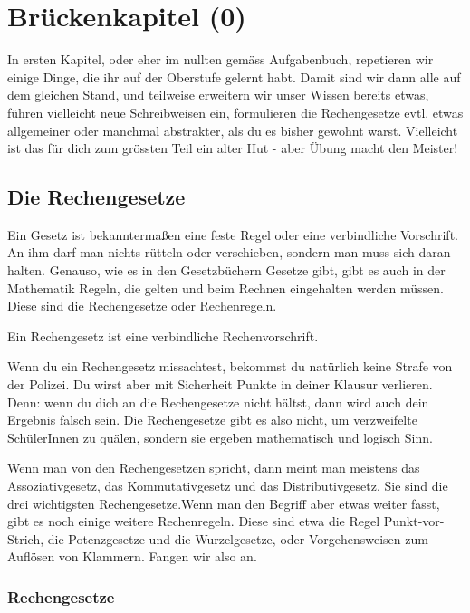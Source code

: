 \chapter{Brückenkapitel (0)}
In ersten Kapitel, oder eher im nullten gemäss Aufgabenbuch, repetieren wir einige Dinge, die ihr auf der Oberstufe gelernt habt. Damit sind wir dann alle auf dem gleichen Stand, und teilweise erweitern wir unser Wissen bereits etwas, führen vielleicht neue Schreibweisen ein, formulieren die Rechengesetze evtl. etwas allgemeiner oder manchmal abstrakter, als du es bisher gewohnt warst. Vielleicht ist das für dich zum grössten Teil ein alter Hut - aber Übung macht den Meister!

\section{Die Rechengesetze}
Ein Gesetz ist bekanntermaßen eine feste Regel oder eine verbindliche Vorschrift. An ihm darf man nichts rütteln oder verschieben, sondern man muss sich daran halten. Genauso, wie es in den Gesetzbüchern Gesetze gibt, gibt es auch in der Mathematik Regeln, die gelten und beim Rechnen eingehalten werden müssen. Diese sind die Rechengesetze oder Rechenregeln.

\begin{tcolorbox}[colback=green!10!white,colframe=green!70!black,title=Rechengesetz,width=.9\linewidth]
		Ein Rechengesetz ist eine verbindliche Rechenvorschrift.
\end{tcolorbox}

Wenn du ein Rechengesetz missachtest, bekommst du natürlich keine Strafe von der Polizei. Du wirst aber mit Sicherheit Punkte in deiner Klausur verlieren. Denn: wenn du dich an die Rechengesetze nicht hältst, dann wird auch dein Ergebnis falsch sein. Die Rechengesetze gibt es also nicht, um verzweifelte SchülerInnen zu quälen, sondern sie ergeben mathematisch und logisch Sinn.

Wenn man von den Rechengesetzen spricht, dann meint man meistens das Assoziativgesetz, das Kommutativgesetz und das Distributivgesetz. Sie sind die drei wichtigsten Rechengesetze.Wenn man den Begriff aber etwas weiter fasst, gibt es noch einige weitere Rechenregeln. Diese sind etwa die Regel Punkt-vor-Strich, die Potenzgesetze und die Wurzelgesetze, oder Vorgehensweisen zum Auflösen von Klammern. Fangen wir also an.

\subsection{Rechengesetze}

